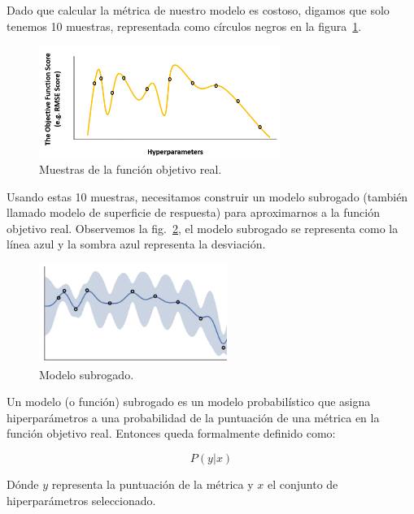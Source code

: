 \documentclass[a4paper,12pt]{article}
\begin{document}
Dado que calcular la métrica de nuestro modelo es costoso, digamos que solo tenemos 10 muestras, representada como círculos negros en la figura~\ref{fig:bayes7}.

\begin{figure}[H]
	\begin{center}
	\includegraphics[width=0.7\textwidth]{bayes_opt_7.png}
  	\caption{Muestras de la función objetivo real.}
  	\label{fig:bayes7}
  	\end{center}
\end{figure}

Usando estas 10 muestras, necesitamos construir un modelo subrogado (también llamado modelo de superficie de respuesta) para aproximarnos a la función objetivo real. Observemos la fig.~\ref{fig:bayes8}, el modelo subrogado se representa como la línea azul y la sombra azul representa la desviación.

\begin{figure}[H]
	\begin{center}
	\includegraphics[width=0.55\textwidth]{bayes_opt_8.png}
  	\caption{Modelo subrogado.}
  	\label{fig:bayes8}
  	\end{center}
\end{figure}

Un modelo (o función) subrogado es un modelo probabilístico que asigna hiperparámetros a una probabilidad de la puntuación de una métrica en la función objetivo real. Entonces queda formalmente definido como:

$$ P(y|x) $$

Dónde $y$ representa la puntuación de la métrica y $x$ el conjunto de hiperparámetros seleccionado.
\end{document}
